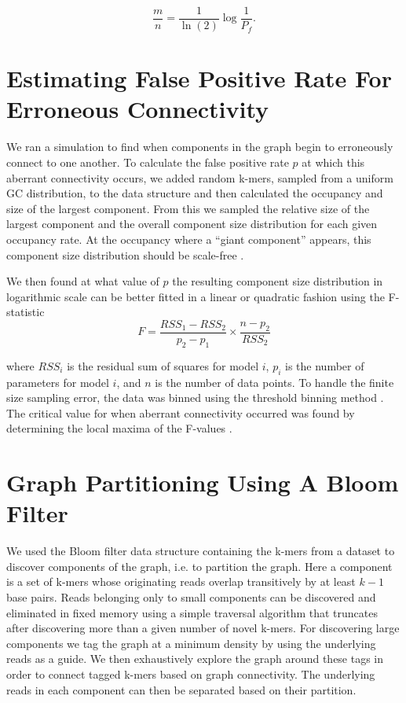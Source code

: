 \documentclass{pnastwo}
\begin{document}
\begin{article}
\begin{materials}
\begin{displaymath}
\frac{m}{n} = \frac{1}{\ln(2)} \log{\frac{1}{P_f}}.
\end{displaymath}

\section{Estimating False Positive Rate For Erroneous Connectivity}
We ran a simulation to find when components in the graph begin to
erroneously connect to one another.  To calculate the false positive
rate $p$ at which this aberrant connectivity occurs, we added random
k-mers, sampled from a uniform GC distribution, to the data structure
and then calculated the occupancy and size of the largest
component. From this we sampled the relative size of the largest
component and the overall component size distribution for each given
occupancy rate.  At the occupancy where a ``giant component'' appears,
this component size distribution should be scale-free
\cite{stauffer1979scaling}.

We then found at what value of $p$ the resulting component size
distribution in logarithmic scale can be better fitted in a linear or
quadratic fashion using the F-statistic
\newline
\newline
\begin{displaymath}
F=\frac{RSS_1-RSS_2}{p_2-p_1} \times \frac{n - p_2}{RSS_2}
\end{displaymath}

where $RSS_i$ is the residual sum of squares for model $i$, $p_i$ is
the number of parameters for model $i$, and $n$ is the number of data
points. To handle the finite size sampling error, the data was binned
using the threshold binning method \cite{adami2002critical}. The
critical value for when aberrant connectivity occurred was found by
determining the local maxima of the F-values \cite{wald43}.

\section{Graph Partitioning Using A Bloom Filter}

We used the Bloom filter data structure containing the k-mers from a
dataset to discover components of the graph, i.e. to partition the
graph.  Here a component is a set of k-mers whose originating reads
overlap transitively by at least $k-1$ base pairs.  Reads belonging
only to small components can be discovered and eliminated in fixed
memory using a simple traversal algorithm that truncates after
discovering more than a given number of novel k-mers.  For discovering
large components we tag the graph at a minimum density by using the
underlying reads as a guide.  We then exhaustively explore the graph
around these tags in order to connect tagged k-mers based on graph
connectivity.  The underlying reads in each component can then be
separated based on their partition.


\end{materials}
\end{article}
\end{document}
